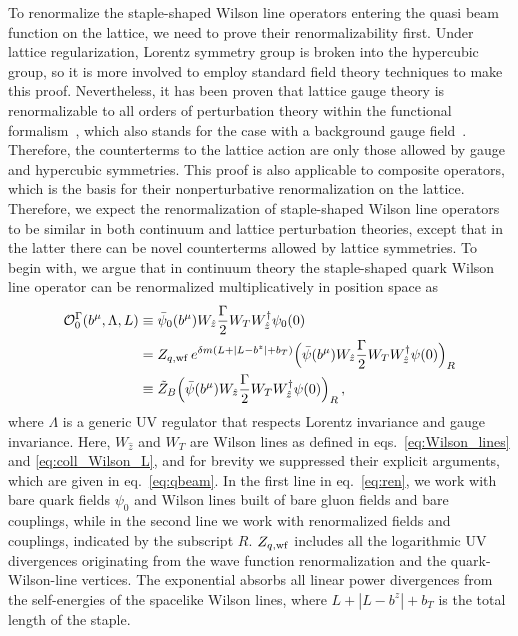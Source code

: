\documentclass[11pt,a4paper]{article}
\DeclareRobustCommand{\eq}[1]{eq.~\eqref{eq:#1}}
\DeclareRobustCommand{\eqs}[2]{eqs.~\eqref{eq:#1} and \eqref{eq:#2}}
\newcommand{\cO}{\mathcal{O}}
\newcommand{\nn}{\nonumber}
\begin{document}
To renormalize the staple-shaped Wilson line operators entering the quasi beam function on the lattice, we need to prove their renormalizability first. Under lattice regularization, Lorentz symmetry group is broken into the hypercubic group, so it is more involved to employ standard field theory techniques to make this proof. Nevertheless, it has been proven that lattice gauge theory is renormalizable to all orders of perturbation theory within the functional formalism~\cite{Reisz:1988kk}, which also stands for the case with a background gauge field~\cite{Luscher:1995vs}. Therefore, the counterterms to the lattice action are only those allowed by gauge and hypercubic symmetries. This proof is also applicable to composite operators, which is the basis for their nonperturbative renormalization on the lattice.
Therefore, we expect the renormalization of staple-shaped Wilson line operators to be similar in both continuum and lattice perturbation theories, except that in the latter there can be novel counterterms allowed by lattice symmetries.
To begin with, we argue that in continuum theory the staple-shaped quark Wilson line operator can be renormalized multiplicatively in position space as
\begin{align} \label{eq:ren}
 \cO_0^\Gamma(b^\mu,\Lambda,L) &
 \equiv\bar \psi_0(b^\mu) W_{\hat z}\frac{\Gamma}{2} W_T W^\dagger_{\hat z} \psi_0(0)
 \nn\\&
 = Z_{q,\rm wf} \, e^{\delta m (L + |L - b^z| + b_T)} \Bigl(\bar \psi(b^\mu) W_{\hat z}\frac{\Gamma}{2} W_T W^\dagger_{\hat z} \psi(0)\Bigr)_R
 \nn\\&
 \equiv \tilde Z_B \Bigl(\bar \psi(b^\mu) W_{\hat z}\frac{\Gamma}{2} W_T W^\dagger_{\hat z} \psi(0)\Bigr)_R
\,,\end{align}
where $\Lambda$ is a generic UV regulator that respects Lorentz invariance and gauge invariance.
Here, $W_{\hat{z}}$ and $W_T$ are Wilson lines as defined in \eqs{Wilson_lines}{coll_Wilson_L},
and for brevity we suppressed their explicit arguments, which are given in \eq{qbeam}.
In the first line in \eq{ren}, we work with bare quark fields $\psi_0$ and Wilson lines
built of bare gluon fields and bare couplings, while in the second line we work with renormalized fields and couplings, indicated by the subscript $R$.
$Z_{q,\rm wf}$ includes all the logarithmic UV divergences originating from the wave function renormalization
and the quark-Wilson-line vertices. The exponential absorbs all linear power divergences
from the self-energies of the spacelike Wilson lines, where $L + |L - b^z| + b_T$
is the total length of the staple. 
\end{document}
